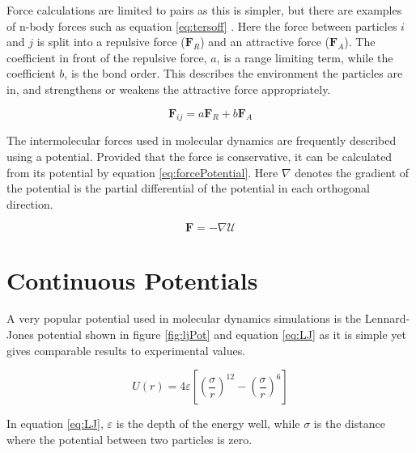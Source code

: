 \documentclass[12pt]{UoAthesis}
\begin{document}
Force calculations are limited to pairs as this is simpler, but there
are examples of n-body forces such as equation \eqref{eq:tersoff}
\cite{Tersoff1988}.  Here the force between particles $i$ and $j$ is
split into a repulsive force ($\mathbf{F}_R$) and an attractive force
($\mathbf{F}_A$).  The coefficient in front of the repulsive force,
$a$, is a range limiting term, while the coefficient $b$, is the bond
order.  This describes the environment the particles are in, and
strengthens or weakens the attractive force appropriately.

\begin{equation}
  \mathbf{F}_{ij} = a\mathbf{F}_{R} + b\mathbf{F}_A
  \label{eq:tersoff}
\end{equation}

The intermolecular forces used in molecular dynamics are frequently
described using a potential.  Provided that the force is conservative,
it can be calculated from its potential by equation
\eqref{eq:forcePotential}. Here $\nabla$ denotes the gradient of the
potential is the partial differential of the potential in each
orthogonal direction.

\begin{equation} 
  \mathbf{F}=-\nabla \mathcal{U} 
  \label{eq:forcePotential} 
\end{equation}


\section{Continuous Potentials}


A very popular potential used in molecular dynamics simulations is the
Lennard-Jones potential \cite{Lennard-Jones1924} shown in figure
\ref{fig:ljPot} and equation \eqref{eq:LJ} as it is simple yet gives
comparable results to experimental values.

\begin{equation} 
  U(r) = 4 \varepsilon \left[ \left( \frac{\sigma}{r} \right)^{12}
    -\left( \frac{\sigma}{r} \right)^{6} \right] 
  \label{eq:LJ} 
\end{equation}

In equation \eqref{eq:LJ}, $\varepsilon$ is the depth of the energy
well, while $\sigma$ is the distance where the potential between two
particles is zero.
\end{document}
